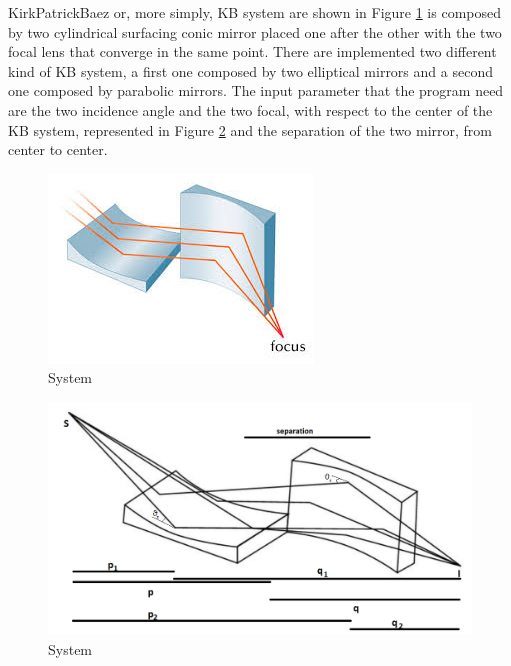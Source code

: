 KirkPatrickBaez or, more simply, KB system are shown in Figure \ref{fig: KB} is composed by two cylindrical surfacing conic mirror placed one after the other with the two focal lens that converge in the same point. There are implemented two different kind of KB system, a first one composed by two elliptical mirrors and a second one composed by parabolic mirrors. The input parameter that the program need are the two incidence angle and the two focal, with respect to the center of the KB system, represented in Figure \ref{fig: KB1} and the separation of the two mirror, from center to center.
\begin{figure}[H]
%
\centering
%
\includegraphics[width=.4\textwidth]{Immagini/Chapter3/KB}
%
\caption{System}
%
\label{fig: KB}
%
\end{figure}
\begin{figure}[H]
%
%
\includegraphics[width=.8\textwidth]{Immagini/Chapter3/KB1}
%
\caption{System}
%
\label{fig: KB1}
%
\end{figure}
%
%
%
%
